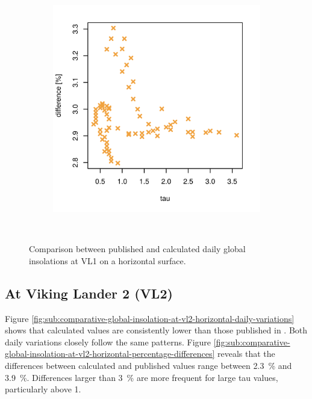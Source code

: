 \begin{figure}[H]
\begin{subfigure}[t]{\subfigureWidth}
            \includegraphics[height=\graphicsHeight]{sections/appendix/insolation-calculation-verification/plots/hh-diff-bet-exp-calc-at-vl1.png}
            \label{fig:sub:comparative-global-insolation-at-vl1-horizontal-percentage-differences}
    \end{subfigure}\\[0.8ex]
    \caption{Comparison between published and calculated daily global insolations at \ac{VL1} on a horizontal surface.}
    \label{fig:plot:comparative-global-insolation-at-vl1-horizontal}
\vspace{-2ex}
\end{figure}

\subsection{At Viking Lander 2 (VL2)}
Figure \ref{fig:sub:comparative-global-insolation-at-vl2-horizontal-daily-variations} shows that calculated values are consistently lower than those published in . Both daily variations closely follow the same patterns. Figure \ref{fig:sub:comparative-global-insolation-at-vl2-horizontal-percentage-differences} reveals that the differences between calculated and published values range between \SI{2.3}{\percent} and \SI{3.9}{\percent}. Differences larger than \SI{3}{\percent} are more frequent for large tau values, particularly above 1.

